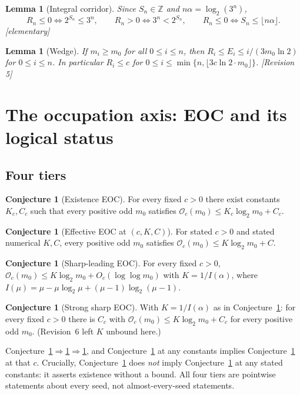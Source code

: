\documentclass[11pt]{article}
\theoremstyle{plain}
\newtheorem{lemma}[theorem]{Lemma}
\theoremstyle{definition}
\newtheorem{conjecture}[theorem]{Conjecture}
\theoremstyle{remark}
\newcommand{\Occ}{\mathcal{O}}
\newcommand{\al}{\alpha}
\newcommand{\status}[1]{\textsf{\footnotesize[#1]}}
\begin{document}
\begin{lemma}[Integral corridor]\label{lem:integral}
Since $S_n\in\mathbb{Z}$ and $n\al=\log_2(3^n)$,
\[
R_n\le 0\iff 2^{S_n}\le 3^n,\qquad R_n>0\iff 3^n<2^{S_n},\qquad R_n\le0\iff S_n\le\lfloor n\al\rfloor .
\]
\status{elementary}
\end{lemma}

\begin{lemma}[Wedge]\label{lem:wedge}
If $m_i\ge m_0$ for all $0\le i\le n$, then $R_i\le E_i\le i/(3m_0\ln2)$ for $0\le i\le n$. In
particular $R_i\le c$ for $0\le i\le\min\{n,\lfloor 3c\ln2\cdot m_0\rfloor\}$.
\status{Revision 5}
\end{lemma}

\section{The occupation axis: EOC and its logical status}\label{sec:occupation}

\subsection{Four tiers}

\begin{conjecture}[Existence EOC]\label{conj:exist}
For every fixed $c>0$ there exist constants $K_c,C_c$ such that every positive odd $m_0$ satisfies
$\Occ_c(m_0)\le K_c\log_2 m_0+C_c$.
\end{conjecture}

\begin{conjecture}[Effective EOC at $(c,K,C)$]\label{conj:eff}
For stated $c>0$ and stated numerical $K,C$, every positive odd $m_0$ satisfies
$\Occ_c(m_0)\le K\log_2 m_0+C$.
\end{conjecture}

\begin{conjecture}[Sharp-leading EOC]\label{conj:sharp}
For every fixed $c>0$, $\Occ_c(m_0)\le K\log_2 m_0+O_c(\log\log m_0)$ with $K=1/I(\al)$, where
$I(\mu)=\mu-\mu\log_2\mu+(\mu-1)\log_2(\mu-1)$.
\end{conjecture}

\begin{conjecture}[Strong sharp EOC]\label{conj:strong}
With $K=1/I(\al)$ as in Conjecture~\ref{conj:sharp}: for every fixed $c>0$ there is $C_c$ with
$\Occ_c(m_0)\le K\log_2 m_0+C_c$ for every positive odd $m_0$. (Revision~6 left $K$ unbound here.)
\end{conjecture}

Conjecture~\ref{conj:strong}$\Rightarrow$\ref{conj:sharp}$\Rightarrow$\ref{conj:exist}, and
Conjecture~\ref{conj:eff} at any constants implies Conjecture~\ref{conj:exist} at that $c$.
Crucially, Conjecture~\ref{conj:exist} does \emph{not} imply Conjecture~\ref{conj:eff} at any
stated constants: it asserts existence without a bound. All four tiers are pointwise statements
about every seed, not almost-every-seed statements.
\end{document}
